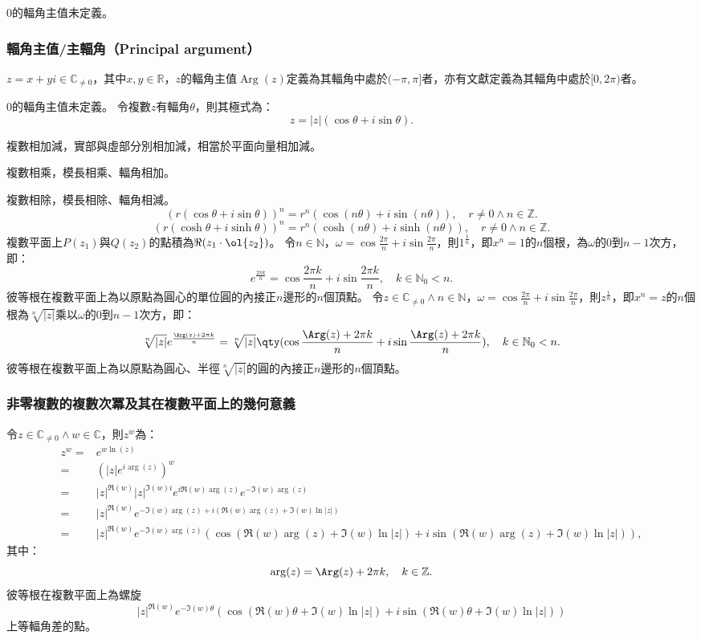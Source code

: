 \documentclass[a4paper,12pt]{article}
\begin{document}
$0$的輻角主值未定義。
\subsubsection{輻角主值/主輻角（Principal argument）}
$z=x+yi\in\mathbb {C} _{\neq 0}$，其中$x,y\in\mathbb{R}$，$z$的輻角主值$\operatorname{Arg}(z)$定義為其輻角中處於$(-\pi,\pi]$者，亦有文獻定義為其輻角中處於$[0,2\pi)$者。

$0$的輻角主值未定義。
令複數$z$有輻角$\theta$，則其極式為：
\[z=|z|(\cos\theta+i\sin\theta).\]
\bit
\item 複數相加減，實部與虛部分別相加減，相當於平面向量相加減。
\item 複數相乘，模長相乘、輻角相加。
\item 複數相除，模長相除、輻角相減。
\eit
{}
\[(r(\cos\theta+i\sin\theta))^n=r^n(\cos(n\theta)+i\sin(n\theta)),\quad r\neq 0\land n\in\mathbb{Z}.\]
\[(r(\cosh\theta+i\sinh\theta))^n=r^n(\cosh(n\theta)+i\sinh(n\theta)),\quad r\neq 0\land n\in\mathbb{Z}.\]
複數平面上$P(z_1)$與$Q(z_2)$的點積為$\Re(z_1\cdot\ol{z_2})$。
令$n\in\mathbb{N}$，$\omega=\cos\frac{2\pi}{n}+i\sin\frac{2\pi}{n}$，則$1^{\frac{1}{n}}$，即$x^n=1$的$n$個根，為$\omega$的0到$n-1$次方，即：
\[e^{\frac{2\pi k}{n}}=\cos\frac{2\pi k}{n}+i\sin\frac{2\pi k}{n},\quad k\in\mathbb{N}_0<n.\]
彼等根在複數平面上為以原點為圓心的單位圓的內接正$n$邊形的$n$個頂點。
令$z\in\mathbb{C}_{\neq 0}\land n\in\mathbb{N}$，$\omega=\cos\frac{2\pi}{n}+i\sin\frac{2\pi}{n}$，則$z^{\frac{1}{n}}$，即$x^n=z$的$n$個根為$\sqrt[n]{|z|}$乘以$\omega$的0到$n-1$次方，即：
\[\sqrt[n]{|z|}e^{\frac{\Arg(z)+2\pi k}{n}}=\sqrt[n]{|z|}\qty(\cos\frac{\Arg(z)+2\pi k}{n}+i\sin\frac{\Arg(z)+2\pi k}{n}),\quad k\in\mathbb{N}_0<n.\]
彼等根在複數平面上為以原點為圓心、半徑$\sqrt[n]{|z|}$的圓的內接正$n$邊形的$n$個頂點。
\subsubsection{非零複數的複數次冪及其在複數平面上的幾何意義}
令$z\in\mathbb{C}_{\neq 0}\land w\in\mathbb{C}$，則$z^w$為：
\[\begin{aligned}
z^w=&e^{w\ln(z)}\\
=&\left(|z|e^{i\arg(z)}\right)^w\\
=&|z|^{\Re(w)}|z|^{\Im(w)i}e^{i\Re(w)\arg(z)}e^{-\Im(w)\arg(z)}\\
=&|z|^{\Re(w)}e^{-\Im(w)\arg(z)+i(\Re(w)\arg(z)+\Im(w)\ln|z|)}\\
=&|z|^{\Re(w)}e^{-\Im(w)\arg(z)}\left(\cos(\Re(w)\arg(z)+\Im(w)\ln|z|)+i\sin(\Re(w)\arg(z)+\Im(w)\ln|z|)\right),
\end{aligned}\]
其中：
\[\arg(z)=\Arg(z)+2\pi k,\quad k\in\mathbb{Z}.\]
彼等根在複數平面上為螺旋
\[|z|^{\Re(w)}e^{-\Im(w)\theta}\left(\cos(\Re(w)\theta+\Im(w)\ln|z|)+i\sin(\Re(w)\theta+\Im(w)\ln|z|)\right)\]
上等輻角差的點。
\end{document}
